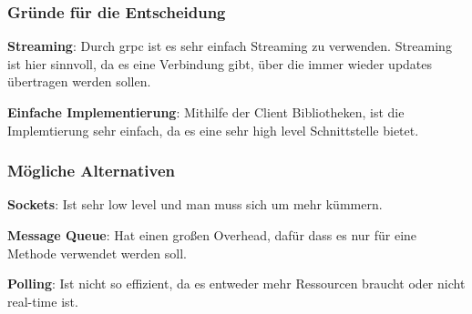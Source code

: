 \subsubsection{Gründe für die Entscheidung}\label{subsubsec:grunde-fur-die-entscheidung-01}

\textbf{Streaming}: Durch grpc ist es sehr einfach Streaming zu verwenden.
Streaming ist hier sinnvoll, da es eine Verbindung gibt, über die immer wieder updates übertragen werden sollen.

\textbf{Einfache Implementierung}: Mithilfe der Client Bibliotheken, ist die Implemtierung sehr einfach, da es eine
sehr high level Schnittstelle bietet.

\subsubsection{Mögliche Alternativen}\label{subsubsec:mogliche-alternativen-01}

\textbf{Sockets}: Ist sehr low level und man muss sich um mehr kümmern.

\textbf{Message Queue}: Hat einen großen Overhead, dafür dass es nur für eine Methode verwendet werden soll.

\textbf{Polling}: Ist nicht so effizient, da es entweder mehr Ressourcen braucht oder nicht real-time ist.